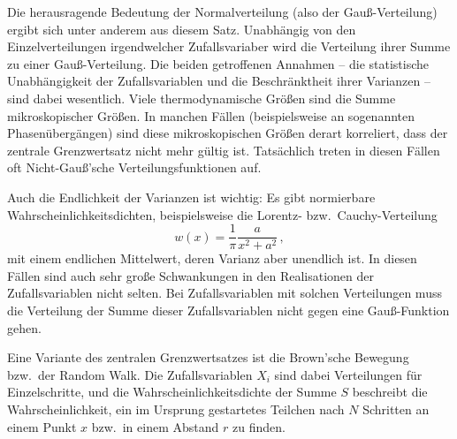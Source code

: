 Die herausragende Bedeutung der
Normalverteilung (also der Gau\ss-Verteilung)
ergibt sich unter anderem aus diesem Satz.
Unabh\"angig von den Einzelverteilungen 
irgendwelcher Zufallsvariaber wird die 
Verteilung ihrer Summe zu einer Gau\ss-Verteilung.
Die beiden getroffenen Annahmen -- die
statistische Unabh\"angigkeit der Zufallsvariablen
und die Beschr\"anktheit ihrer Varianzen -- sind
dabei wesentlich. Viele thermodynamische
Gr\"o\ss en sind die Summe mikroskopischer
Gr\"o\ss en. In manchen F\"allen (beispielsweise
an sogenannten Phasen\"uberg\"angen) 
sind diese mikroskopischen Gr\"o\ss en
derart korreliert, dass der zentrale Grenzwertsatz
nicht mehr g\"ultig ist. Tats\"achlich treten in 
diesen F\"allen oft Nicht-Gau\ss'sche 
Verteilungsfunktionen auf. 

Auch die Endlichkeit
der Varianzen ist wichtig: Es gibt normierbare
Wahrscheinlichkeitsdichten, beispielsweise
die Lorentz- bzw.\ Cauchy-Verteilung 
\begin{equation}
  w(x) = \frac{1}{\pi} \frac{a}{x^2 + a^2} \, ,
\end{equation}
mit einem endlichen Mittelwert, deren
Varianz aber unendlich ist. In diesen F\"allen
sind auch sehr gro\ss e Schwankungen
in den Realisationen der Zufallsvariablen
nicht selten. Bei Zufallsvariablen mit solchen
Verteilungen muss die Verteilung der Summe 
dieser Zufallsvariablen nicht gegen
eine Gau\ss-Funktion gehen. 

Eine Variante des zentralen Grenzwertsatzes
ist die Brown'sche Bewegung bzw.\ der
Random Walk. Die Zufallsvariablen $X_i$ sind
dabei Verteilungen f\"ur Einzelschritte, und
die Wahrscheinlichkeitsdichte der Summe $S$ 
beschreibt die Wahrscheinlichkeit, ein im
Ursprung gestartetes Teilchen nach 
$N$ Schritten an einem Punkt $x$ bzw.\
in einem Abstand $r$ zu finden. 

%
